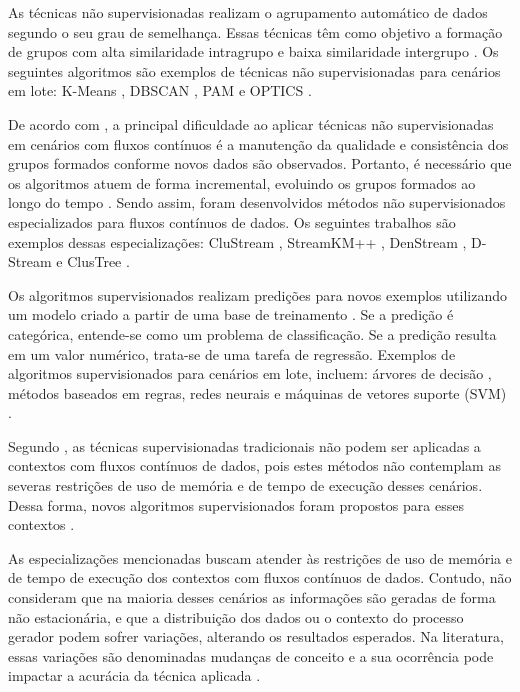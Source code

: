 \documentclass[msc, classic, a4paper]{ufbathesis}
\begin{document}
As técnicas não supervisionadas realizam o agrupamento automático de dados segundo o seu grau de semelhança.
Essas técnicas têm como objetivo a formação de grupos com alta similaridade intragrupo e baixa similaridade intergrupo \cite{Jain:1988:ACD:46712}.
Os seguintes algoritmos são exemplos de técnicas não supervisionadas para cenários em lote:
K-Means \cite{Lloyd:2006:LSQ:2263356.2269955},
DBSCAN \cite{Ester:1996:DAD:3001460.3001507},
PAM \cite{kaufman:clustering1990} e
OPTICS \cite{Ankerst:1999:OOP:304181.304187}.

De acordo com , a principal dificuldade ao aplicar técnicas não supervisionadas em cenários com fluxos contínuos é a manutenção da qualidade e consistência dos grupos formados conforme novos dados são observados.
Portanto, é necessário que os algoritmos atuem de forma incremental, evoluindo os grupos formados ao longo do tempo \cite{Barbara:2002:RCD:507515.507519}.
Sendo assim, foram desenvolvidos métodos não supervisionados especializados para fluxos contínuos de dados.
Os seguintes trabalhos são exemplos dessas especializações:
CluStream \cite{Aggarwal:2003:FCE:1315451.1315460},
StreamKM++ \cite{Ackermann:2012:SCA:2133803.2184450},
DenStream \cite{Cao:Feng:Ester},
D-Stream \cite{Chen:Tu} e ClusTree \cite{Kranen:2011:CIM:2134350.2134352}.

Os algoritmos supervisionados realizam predições para novos exemplos utilizando um modelo criado a partir de uma base de treinamento \cite{Kotsiantis:2007:SML:1566770.1566773}.
Se a predição é categórica, entende-se como um problema de classificação.
Se a predição resulta em um valor numérico, trata-se de uma tarefa de regressão.
Exemplos de algoritmos supervisionados para cenários em lote, incluem:
árvores de decisão \cite{Breiman:Classification_Regression_Trees},
métodos baseados em regras,
redes neurais e máquinas de vetores suporte (SVM) \cite{Vapnik1998}.

Segundo ,
as técnicas supervisionadas tradicionais não podem ser aplicadas a contextos com fluxos contínuos de dados,
pois estes métodos não contemplam as severas restrições de uso de memória e de tempo de execução desses cenários.
%
Dessa forma,
novos algoritmos supervisionados foram propostos para esses contextos \cite{Domingos:2000:MHD:347090.347107, Bifet:2013:EDS:2480362.2480516, Wang:2003:MCD:956750.956778, Aggarwal:2004:DCD:1014052.1014110, Gama:2003:ADT:956750.956813}.

As especializações mencionadas buscam atender às restrições de uso de memória e de tempo de execução dos contextos com fluxos contínuos de dados.
Contudo, não consideram que na maioria desses cenários as informações são geradas de forma não estacionária, e que a distribuição dos dados ou o contexto do processo gerador podem sofrer variações, alterando os resultados esperados.
Na literatura, essas variações são denominadas mudanças de conceito e a sua ocorrência pode impactar a acurácia da técnica aplicada \cite{Gama:2010:KDD:1855075}.
\end{document}
